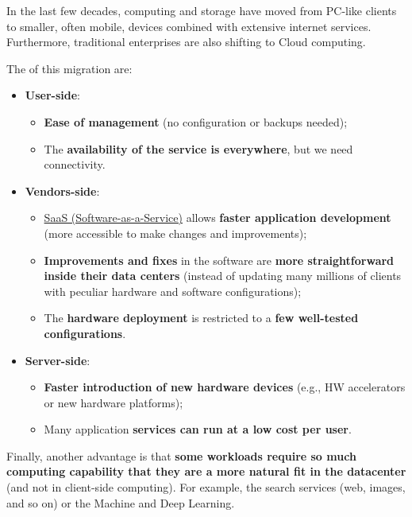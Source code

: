 \noindent
In the last few decades, computing and storage have moved from PC-like clients to smaller, often mobile, devices combined with extensive internet services. Furthermore, traditional enterprises are also shifting to Cloud computing.

\highspace
The  of this migration are:
\begin{itemize}
    \item \textbf{User-side}:
    \begin{itemize}
        \item \textbf{Ease of management} (no configuration or backups needed);
        
        \item The \textbf{availability of the service is everywhere}, but we need connectivity.
    \end{itemize}
    
    \item \textbf{Vendors-side}:
    \begin{itemize}
        \item \href{https://en.wikipedia.org/wiki/Software_as_a_service}{SaaS (Software-as-a-Service)} allows \textbf{faster application development} (more accessible to make changes and improvements);

        \item \textbf{Improvements and fixes} in the software are \textbf{more straightforward inside their data centers} (instead of updating many millions of clients with peculiar hardware and software configurations);
        
        \item The \textbf{hardware deployment} is restricted to a \textbf{few well-tested configurations}.
    \end{itemize} 

    \item \textbf{Server-side}:
    \begin{itemize}
        \item \textbf{Faster introduction of new hardware devices} (e.g., HW accelerators or new hardware platforms);

        \item Many application \textbf{services can run at a low cost per user}.
    \end{itemize}
\end{itemize}
Finally, another advantage is that \textbf{some workloads require so much computing capability that they are a more natural fit in the datacenter} (and not in client-side computing). For example, the search services (web, images, and so on) or the Machine and Deep Learning.

